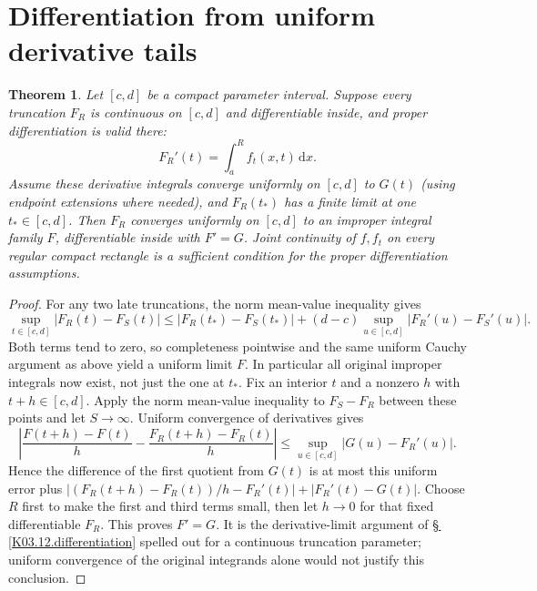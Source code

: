 \documentclass[11pt,oneside,a4paper]{book}
\newtheorem{theorem}{Theorem}[chapter]
\theoremstyle{definition}
\theoremstyle{remark}
\newcommand{\dd}{\,\mathrm d}
\newcommand{\KEntry}[2]{\Needspace{7\baselineskip}\section{#2}\label{#1}{\small\sffamily\color{black!60}\detokenize{#1}}\par}
\newcommand{\KRef}[1]{\hyperref[#1]{\S\,\ref*{#1}}}
\begin{document}
\KEntry{K03.14.improper_derivative}{Differentiation from uniform derivative tails}
\begin{theorem}
Let $[c,d]$ be a compact parameter interval. Suppose every truncation
$F_R$ is continuous on $[c,d]$ and differentiable inside, and proper
differentiation is valid there:
\[F_R'(t)=\int_a^R f_t(x,t)\dd x.
\]
Assume these derivative integrals converge uniformly on $[c,d]$ to
$G(t)$ (using endpoint extensions where needed), and $F_R(t_*)$ has a
finite limit at one $t_*\in[c,d]$. Then $F_R$ converges uniformly on
$[c,d]$ to an improper integral family $F$, differentiable inside with
$F'=G$. Joint continuity of $f,f_t$ on every regular compact rectangle
is a sufficient condition for the proper differentiation assumptions.
\end{theorem}
\begin{proof}
For any two late truncations, the norm mean-value inequality gives
\[\sup_{t\in[c,d]}|F_R(t)-F_S(t)|
\le|F_R(t_*)-F_S(t_*)|+(d-c)\sup_{u\in[c,d]}|F_R'(u)-F_S'(u)|.
\]
Both terms tend to zero, so completeness pointwise and the same uniform
Cauchy argument as above yield a uniform limit $F$. In particular all
original improper integrals now exist, not just the one at $t_*$.
Fix an interior $t$ and a nonzero $h$ with $t+h\in[c,d]$.
Apply the norm mean-value inequality to $F_S-F_R$ between these points
and let $S\to\infty$. Uniform convergence of derivatives gives
\[\left|\frac{F(t+h)-F(t)}h-
\frac{F_R(t+h)-F_R(t)}h\right|
\le\sup_{u\in[c,d]}|G(u)-F_R'(u)|.
\]
Hence the difference of the first quotient from $G(t)$ is at most this
uniform error plus
$|(F_R(t+h)-F_R(t))/h-F_R'(t)|+|F_R'(t)-G(t)|$.
Choose $R$ first to make the first and third terms small, then let
$h\to0$ for that fixed differentiable $F_R$. This proves $F'=G$.
It is the derivative-limit argument of \KRef{K03.12.differentiation}
spelled out for a continuous truncation parameter; uniform convergence
of the original integrands alone would not justify this conclusion.
\end{proof}
\end{document}
